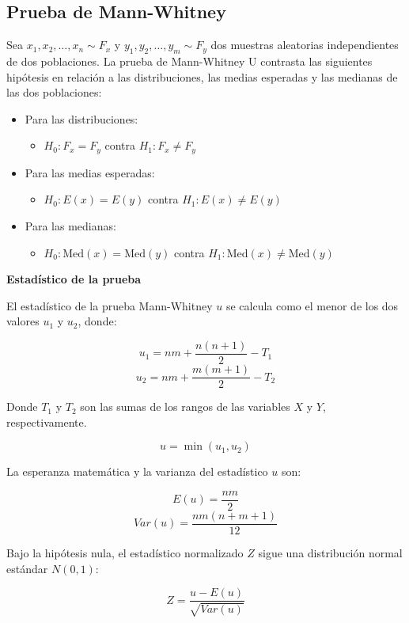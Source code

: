 \documentclass{article}
\begin{document}
\subsection{Prueba de Mann-Whitney}

Sea $x_1, x_2, \ldots, x_n \sim F_x$ y $y_1, y_2, \ldots, y_m \sim F_y$ dos muestras aleatorias independientes de dos poblaciones. La prueba de Mann-Whitney U contrasta las siguientes hipótesis en relación a las distribuciones, las medias esperadas y las medianas de las dos poblaciones:

\begin{itemize}
    \item Para las distribuciones:
          \begin{itemize}
              \item $H_0: F_x = F_y$ contra $H_1: F_x \neq F_y$
          \end{itemize}
    \item Para las medias esperadas:
          \begin{itemize}
              \item $H_0: E(x) = E(y)$ contra $H_1: E(x) \neq E(y)$
          \end{itemize}
    \item Para las medianas:
          \begin{itemize}
              \item $H_0: \text{Med}(x) = \text{Med}(y)$ contra $H_1: \text{Med}(x) \neq \text{Med}(y)$
          \end{itemize}
\end{itemize}
\textbf{Estadístico de la prueba}

El estadístico de la prueba Mann-Whitney $u$ se calcula como el menor de los dos valores $u_1$ y $u_2$, donde:

\[
    u_1 = nm + \frac{n(n+1)}{2} - T_1
\]
\[
    u_2 = nm + \frac{m(m+1)}{2} - T_2
\]

Donde $T_1$ y $T_2$ son las sumas de los rangos de las variables $X$ y $Y$, respectivamente.

\[
    u = \min(u_1, u_2)
\]

La esperanza matemática y la varianza del estadístico $u$ son:

\[
    E(u) = \frac{nm}{2}
\]
\[
    Var(u) = \frac{nm(n+m+1)}{12}
\]

Bajo la hipótesis nula, el estadístico normalizado $Z$ sigue una distribución normal estándar $N(0,1)$:

\[
    Z = \frac{u - E(u)}{\sqrt{Var(u)}}
\]
\end{document}
